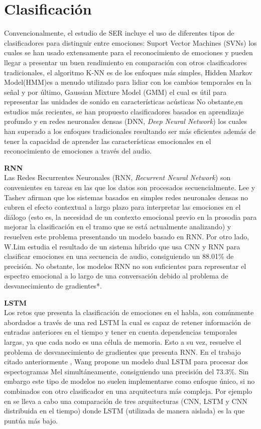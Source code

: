 \documentclass[11pt,a4paper,spanish]{book}
\begin{document}
	
	
	\section{Clasificación}
	Convencionalmente, el estudio de SER incluye el uso de diferentes tipos de clasificadores para distinguir entre emociones: Suport Vector Machines (SVNs) los cuales se han usado extensamente para el reconocimiento de emociones y pueden llegar a presentar un buen rendimiento en comparación con otros clasificadores tradicionales, el algoritmo K-NN es de los enfoques más simples, Hidden Markov Model(HMM)es a menudo utilizado para lidiar con los cambios temporales en la señal y por último, Gaussian Mixture Model (GMM) el cual es útil para representar las unidades de sonido en características acústicas %
	No obstante,en estudios más recientes, se han propuesto clasificadores basados en aprendizaje profundo y en redes neuronales densas (DNN, \emph{Deep Neural Network}) los cuales han superado a los enfoques tradicionales resultando ser más eficientes además de tener la capacidad de aprender las características emocionales en el reconocimiento de emociones a través del audio.\hfill \break
	
	\textbf{RNN} \\
	 Las Redes Recurrentes Neuronales (RNN, \emph{Recurrent Neural Network}) son convenientes en tareas en las que los datos son procesados secuencialmente.
	Lee y Tashev \cite{Lee2015} afirman que los sistemas basados en simples redes neuronales densas no cubren el efecto contextual a largo plazo para interpretar las emociones en el diálogo (esto es, la necesidad de un contexto emocional previo en la prosodia para mejorar la clasificación en el tramo que se está actualmente analizando) y resuelven este problema presentando un modelo basado en RNN. Por otro lado, W.Lim \cite{Lim2017} estudia el resultado de un sistema híbrido que usa CNN y RNN para clasificar emociones en una secuencia de audio, consiguiendo un 88.01\% de precisión.
	No obstante, los modelos RNN no son suficientes para representar el espectro emocional a lo largo de una conversación debido al problema de desvanecimiento de gradientes*.\newline
	
	\textbf{LSTM}\\
	Los retos que presenta la clasificación de emociones en el habla, son comúnmente abordados a través de una red LSTM la cual es capaz de retener información de entradas anteriores en el tiempo y tener en cuenta dependencias temporales largas, ya que cada nodo es una célula de memoria. Esto a su vez, resuelve el problema de desvanecimiento de gradientes que presenta RNN.
	En el trabajo citado anteriormente \cite{Wang2020}, Wang propone un modelo dual LSTM para procesar dos espectogramas Mel simultáneamente, consiguiendo una precisión del 73.3\%. 
	Sin embargo este tipo de modelos no suelen implementarse como enfoque único, si no combinados con otro clasificador en una arquitectura más compleja. Por ejemplo en \cite{Lim2017} se lleva a cabo una comparación de tres  arquitecturas (CNN, LSTM y CNN distribuida en el tiempo) donde LSTM (utilizada de manera aislada) es la que puntúa más bajo.\newline	
	
\end{document}
